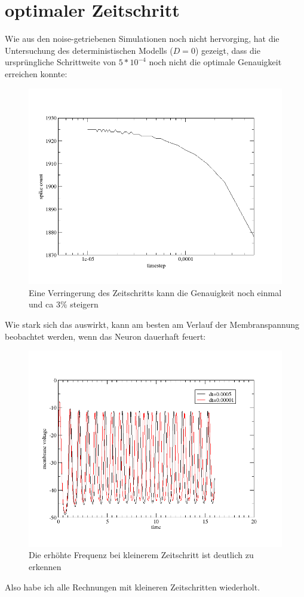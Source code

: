 \documentclass[12pt,a4paper]{article}
\begin{document}
\section{optimaler Zeitschritt}
Wie aus den noise-getriebenen Simulationen noch nicht hervorging, hat die Untersuchung des deterministischen Modells ($D=0$) gezeigt, dass die ursprüngliche Schrittweite von $5*10^{-4}$ noch nicht die optimale Genauigkeit erreichen konnte:
\begin{figure}[H]
\centering
\includegraphics[scale=0.4]{timestep.png} 
\caption{Eine Verringerung des Zeitschritts kann die Genauigkeit noch einmal und ca 3\% steigern}
\label{ts}
\end{figure}
Wie stark sich das auswirkt, kann am besten am Verlauf der Membranspannung beobachtet werden, wenn das Neuron dauerhaft feuert:
\begin{figure}[H]
	\centering
	\includegraphics[scale=0.4]{spikecount.png} 
	\caption{Die erhöhte Frequenz bei kleinerem Zeitschritt ist deutlich zu erkennen}
	\label{sc}
\end{figure}
Also habe ich alle Rechnungen mit kleineren Zeitschritten wiederholt. 
\end{document}
